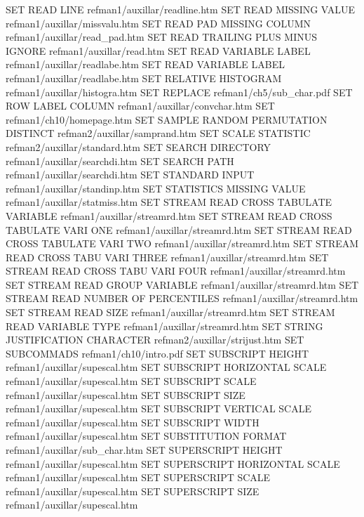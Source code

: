 SET READ LINE                           refman1/auxillar/readline.htm
SET READ MISSING VALUE                  refman1/auxillar/missvalu.htm
SET READ PAD MISSING COLUMN             refman1/auxillar/read_pad.htm
SET READ TRAILING PLUS MINUS IGNORE     refman1/auxillar/read.htm
SET READ VARIABLE LABEL                 refman1/auxillar/readlabe.htm
SET READ VARIABLE LABEL                 refman1/auxillar/readlabe.htm
SET RELATIVE HISTOGRAM                  refman1/auxillar/histogra.htm
SET REPLACE                             refman1/ch5/sub_char.pdf
SET ROW LABEL COLUMN                    refman1/auxillar/convchar.htm
SET                                     refman1/ch10/homepage.htm
SET SAMPLE RANDOM PERMUTATION DISTINCT  refman2/auxillar/samprand.htm
SET SCALE STATISTIC                     refman2/auxillar/standard.htm
SET SEARCH DIRECTORY                    refman1/auxillar/searchdi.htm
SET SEARCH PATH                         refman1/auxillar/searchdi.htm
SET STANDARD INPUT                      refman1/auxillar/standinp.htm
SET STATISTICS MISSING VALUE            refman1/auxillar/statmiss.htm
SET STREAM READ CROSS TABULATE VARIABLE refman1/auxillar/streamrd.htm
SET STREAM READ CROSS TABULATE VARI ONE refman1/auxillar/streamrd.htm
SET STREAM READ CROSS TABULATE VARI TWO refman1/auxillar/streamrd.htm
SET STREAM READ CROSS TABU VARI THREE   refman1/auxillar/streamrd.htm
SET STREAM READ CROSS TABU VARI FOUR    refman1/auxillar/streamrd.htm
SET STREAM READ GROUP VARIABLE          refman1/auxillar/streamrd.htm
SET STREAM READ NUMBER OF PERCENTILES   refman1/auxillar/streamrd.htm
SET STREAM READ SIZE                    refman1/auxillar/streamrd.htm
SET STREAM READ VARIABLE TYPE           refman1/auxillar/streamrd.htm
SET STRING JUSTIFICATION CHARACTER      refman2/auxillar/strijust.htm
SET SUBCOMMADS                          refman1/ch10/intro.pdf
SET SUBSCRIPT HEIGHT                    refman1/auxillar/supescal.htm
SET SUBSCRIPT HORIZONTAL SCALE          refman1/auxillar/supescal.htm
SET SUBSCRIPT SCALE                     refman1/auxillar/supescal.htm
SET SUBSCRIPT SIZE                      refman1/auxillar/supescal.htm
SET SUBSCRIPT VERTICAL SCALE            refman1/auxillar/supescal.htm
SET SUBSCRIPT WIDTH                     refman1/auxillar/supescal.htm
SET SUBSTITUTION FORMAT                 refman1/auxillar/sub_char.htm
SET SUPERSCRIPT HEIGHT                  refman1/auxillar/supescal.htm
SET SUPERSCRIPT HORIZONTAL SCALE        refman1/auxillar/supescal.htm
SET SUPERSCRIPT SCALE                   refman1/auxillar/supescal.htm
SET SUPERSCRIPT SIZE                    refman1/auxillar/supescal.htm
